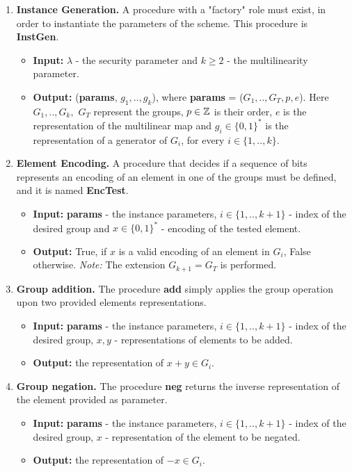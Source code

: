 \begin{enumerate}[label=(\alph*)]
	\item \textbf{Instance Generation.}  A procedure with a "factory" role must exist, in order to instantiate the parameters of the scheme. This procedure is \textbf{InstGen}.
	\begin{itemize}
		\item \textbf{Input:} $\lambda $ - the security parameter and $k \geq 2$ - the multilinearity parameter.
		\item \textbf{Output:} (\textbf{params}, $g_1, .., g_k$), where \textbf{params} = ($G_1, .., G_T, p, e$). Here $G_1,..,G_k,$ $G_T$ represent the groups, $p\in {\mathbb Z}$ is their order, $e$ is the representation of the multilinear map and $g_i \in \{0, 1\}^*$ is the representation of a generator of $G_i$, for every $i \in \{1,..,k\}$.
	\end{itemize}


	\item \textbf{Element Encoding.} A procedure that decides if a sequence of bits represents an encoding of an element in one of the groups must be defined, and it is named \textbf{EncTest}.
		\begin{itemize}
		\item \textbf{Input:} \textbf{params} - the instance parameters, $i \in \{1,..,k+1\}$ - index of the desired group and $x\in \{0,1\}^*$ - encoding of the tested element.
		\item \textbf{Output:} True, if $x$ is a valid encoding of an element in $G_i$, False otherwise. \textit{Note:} The extension $G_{k+1} = G_T$ is performed.
	\end{itemize}


	\item \textbf{Group addition.} The procedure \textbf{add} simply applies the group operation upon two provided elements representations.
\begin{itemize}
	\item \textbf{Input:} \textbf{params} - the instance parameters, $i \in \{1,..,k+1\}$ - index of the desired group, $x,y$ - representations of elements to be added.
	\item \textbf{Output:} the representation of $x+y \in G_i$.                                     
\end{itemize}


	\item \textbf{Group negation.} The procedure \textbf{neg} returns the inverse representation of the  element provided as parameter.
\begin{itemize}
	\item \textbf{Input:} \textbf{params} - the instance parameters, $i \in \{1,..,k+1\}$ - index of the desired group, $x$ - representation of the element to be negated.
	\item \textbf{Output:} the representation of $-x \in G_i$.                                     
\end{itemize}



\end{enumerate}
